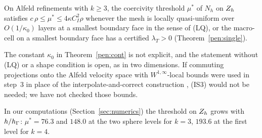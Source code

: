 \begin{corollary}\label{pen:rho}
On Alfeld refinements with $k\ge3$, the coercivity threshold $\mu^\ast$ of $N_h$ on $Z_h$ satisfies $c\,\rho\le\mu^\ast\le4\kappa C_I^2\rho$ whenever the mesh is locally quasi-uniform over $O(1/\kappa_0)$ layers at a smallest boundary face in the sense of (LQ), or the macro-cell on a smallest boundary face has a certified $\lambda_T>0$ (Theorem~\ref{pen:single}).
\end{corollary}

The constant $\kappa_0$ in Theorem~\ref{pen:cont} is not explicit, and the statement without (LQ) or a shape condition is open, as in two dimensions. If commuting projections onto the Alfeld velocity space with $W^{1,\infty}$-local bounds were used in step~3 in place of the interpolate-and-correct construction \cite{FuGuzmanNeilan2020}, (IS3) would not be needed; we have not checked those bounds.

In our computations (Section~\ref{sec:numerics}) the threshold on $Z_h$ grows with $h/h_\Gamma$: $\mu^\ast=76.3$ and $148.0$ at the two sphere levels for $k=3$, $193.6$ at the first level for $k=4$.
